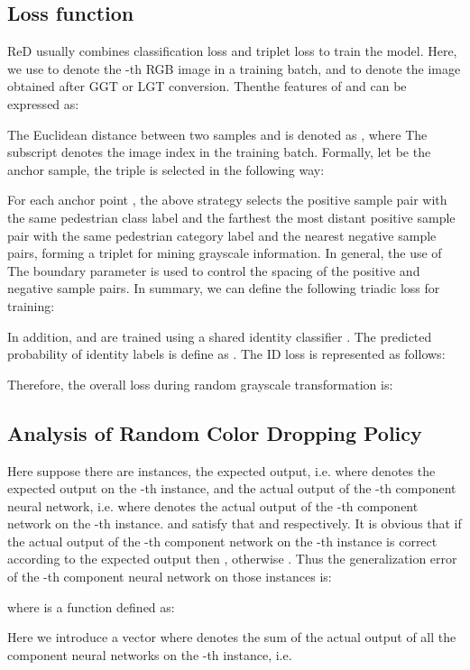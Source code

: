 \documentclass[10pt,twocolumn,letterpaper]{article}
\begin{document}
\subsection{Loss function}
ReD usually combines classification loss and triplet loss to train the model\cite{stong_baseline,FastReID}. Here, we use  to denote the -th RGB image in a training batch, and  to denote the image obtained after GGT or LGT conversion. Thenthe features of  and   can be expressed as:

The Euclidean distance between two samples  and  is denoted as , where The subscript  denotes the image index in the training batch. Formally, let  be the anchor sample, the triple  is selected in the following way:


For each anchor point , the above strategy selects the positive sample pair with the same pedestrian class label and the farthest the most distant positive sample pair with the same pedestrian category label and the nearest negative sample pairs, forming a triplet  for mining grayscale information. In general, the use of The boundary parameter  is used to control the spacing of the positive and negative sample pairs. In summary, we can define the following triadic loss for training:

In addition,  and  are trained using a shared identity classifier . The predicted probability of identity labels  is define as . The ID loss is represented as follows:

Therefore, the overall loss during random grayscale transformation is:


\subsection{Analysis of Random Color Dropping Policy}
Here suppose there are  instances, the expected output, i.e.  where  denotes the expected output on the -th instance, and the actual output of the -th component neural network, i.e.  where  denotes the actual output of the -th component network on the -th instance.  and  satisfy that   and  respectively. It is obvious that if the actual output of the -th component network on the -th instance is correct according to the expected output then , otherwise . Thus the generalization error of the -th component neural network on those  instances is:


where  is a function defined as:


Here we introduce a vector  where  denotes the sum of the actual output of all the component neural networks on the -th instance, i.e.
\end{document}
